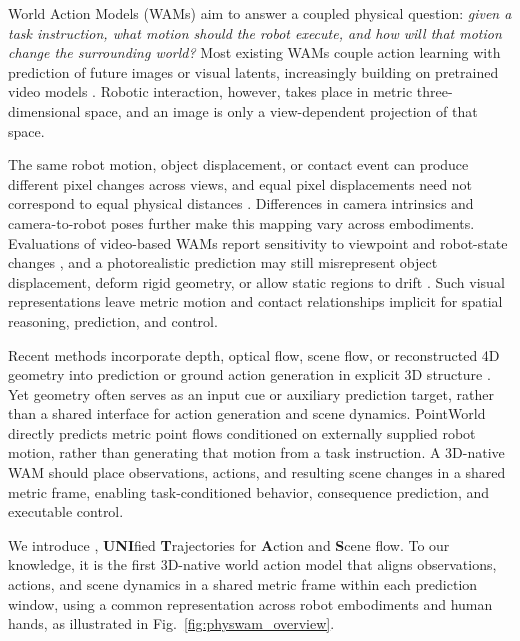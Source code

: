 \label{sec:introduction}

World Action Models (WAMs) aim to answer a coupled physical question:
\emph{given a task instruction, what motion should the robot execute,
and how will that motion change the surrounding world?}
Most existing WAMs couple action learning with prediction of future
images or visual latents, increasingly building on pretrained video models
\citep{yang2023unisim,li2025uva,zhu2025uwm,cen2025worldvla,
bi2025motus,ye2026dreamzero,yuan2026fastwam,zhou2026tau0wm}.
Robotic interaction, however, takes place in metric three-dimensional
space, and an image is only a view-dependent projection of that space.

The same robot motion, object displacement, or contact event can produce
different pixel changes across views, and equal pixel displacements
need not correspond to equal physical distances
\citep{ze2024threediffusion,qu2025spatialvla}.
Differences in camera intrinsics and camera-to-robot poses further
make this mapping vary across embodiments.
Evaluations of video-based WAMs report sensitivity to viewpoint and
robot-state changes \citep{zhang2026wamgeneralization}, and a
photorealistic prediction may still misrepresent object displacement,
deform rigid geometry, or allow static regions to drift
\citep{huang2026pointworld}.
Such visual representations leave metric motion and contact relationships
implicit for spatial reasoning, prediction, and control.

Recent methods incorporate depth, optical flow, scene flow, or
reconstructed 4D geometry into prediction
\citep{zhen2025tesseract,guo2026xwam,zhao2026rynnworld,wang2026lamp}
or ground action generation in explicit 3D structure
\citep{shridhar2023peract,ze2024threediffusion,zhen2024threedvla,
qu2025spatialvla}.
Yet geometry often serves as an input cue or auxiliary prediction target,
rather than a shared interface for action generation and scene dynamics.
PointWorld~\citep{huang2026pointworld} directly predicts metric point
flows conditioned on externally supplied robot motion, rather than
generating that motion from a task instruction.
A 3D-native WAM should place observations, actions, and resulting scene
changes in a shared metric frame, enabling task-conditioned behavior,
consequence prediction, and executable control.

We introduce \method{}, \textbf{UNI}fied \textbf{T}rajectories for
\textbf{A}ction and \textbf{S}cene flow.
To our knowledge, it is the first 3D-native world action model that
aligns observations, actions, and scene dynamics in a shared metric
frame within each prediction window, using a common representation
across robot embodiments and human hands, as illustrated in
Fig.~\ref{fig:physwam_overview}.

